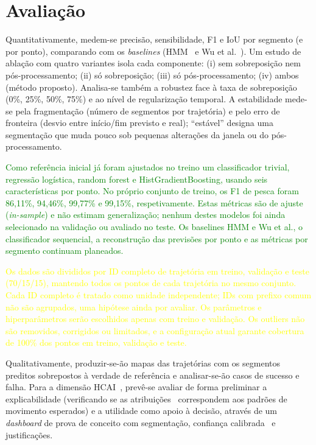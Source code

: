\documentclass{article}
\begin{document}
\section{Avaliação}
\label{sec:avaliacao}

Quantitativamente, medem-se precisão, sensibilidade, F1 e IoU por segmento (e por ponto), comparando com os \emph{baselines} (HMM~\cite{peel2011} e Wu et al.~). Um estudo de ablação com quatro variantes isola cada componente: (i) sem sobreposição nem pós-processamento; (ii) só sobreposição; (iii) só pós-processamento; (iv) ambos (método proposto). Analisa-se também a robustez face à taxa de sobreposição (0\%, 25\%, 50\%, 75\%) e ao nível de regularização temporal. A estabilidade mede-se pela fragmentação (número de segmentos por trajetória) e pelo erro de fronteira (desvio entre início/fim previsto e real); ``estável'' designa uma segmentação que muda pouco sob pequenas alterações da janela ou do pós-processamento.

\textcolor{green}{Como referência inicial já foram ajustados no treino um classificador trivial, regressão logística, random forest e HistGradientBoosting, usando seis características por ponto. No próprio conjunto de treino, os F1 de pesca foram 86,11\%, 94,46\%, 99,77\% e 99,15\%, respetivamente. Estas métricas são de ajuste (\emph{in-sample}) e não estimam generalização; nenhum destes modelos foi ainda selecionado na validação ou avaliado no teste. Os baselines HMM e Wu et al., o classificador sequencial, a reconstrução das previsões por ponto e as métricas por segmento continuam planeados.}

\textcolor{yellow}{Os dados são divididos por ID completo de trajetória em treino, validação e teste (70/15/15), mantendo todos os pontos de cada trajetória no mesmo conjunto. Cada ID completo é tratado como unidade independente; IDs com prefixo comum não são agrupados, uma hipótese ainda por avaliar. Os parâmetros e hiperparâmetros serão escolhidos apenas com treino e validação. Os outliers não são removidos, corrigidos ou limitados, e a configuração atual garante cobertura de 100\% dos pontos em treino, validação e teste.}

Qualitativamente, produzir-se-ão mapas das trajetórias com os segmentos preditos sobrepostos à verdade de referência e analisar-se-ão casos de sucesso e falha. Para a dimensão HCAI~\cite{shneiderman2020}, prevê-se avaliar de forma preliminar a explicabilidade (verificando se as atribuições~\cite{lundberg2017} correspondem aos padrões de movimento esperados) e a utilidade como apoio à decisão, através de um \emph{dashboard} de prova de conceito com segmentação, confiança calibrada~\cite{guo2017} e justificações.



\end{document}
